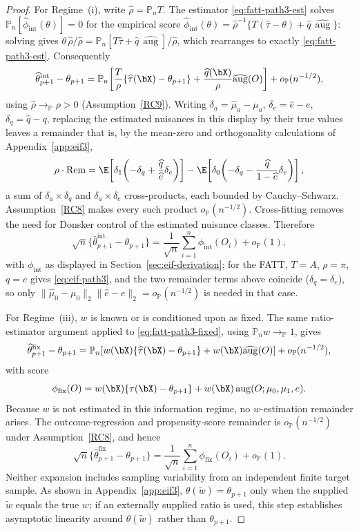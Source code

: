 \documentclass{article}
\renewcommand{\P}{\mathbb{P}}
\begin{document}
\begin{proof}
For Regime~(i), write $\widehat\rho=\mathbb{P}_n T$. The estimator \eqref{eq:fatt-path3-est} solves $\mathbb{P}_n[\widehat\phi_{\mathrm{int}}(\theta)]=0$ for the empirical score $\widehat\phi_{\mathrm{int}}(\theta) = \widehat\rho^{-1}\{T(\widehat\tau-\theta)+\widehat q\,\widehat{\operatorname{aug}}\}$: solving gives $\theta\,\widehat\rho/\widehat\rho = \mathbb{P}_n[T\widehat\tau+\widehat q\,\widehat{\operatorname{aug}}]/\widehat\rho$, which rearranges to exactly \eqref{eq:fatt-path3-est}. Consequently
\[
\widehat{\theta}_{p+1}^{\mathrm{int}}-\theta_{p+1}
=
\mathbb{P}_n\!\left[\frac{T}{\rho}\{\widehat\tau(\bX)-\theta_{p+1}\}+\frac{\widehat q(\bX)}{\rho}\widehat{\operatorname{aug}}(O)\right]
+
o_{\P}(n^{-1/2}),
\]
using $\widehat\rho\to_\P\rho>0$ (Assumption~\ref{RC9}). Writing $\delta_a=\widehat\mu_a-\mu_a$, $\delta_e=\widehat e-e$, $\delta_q=\widehat q-q$, replacing the estimated nuisances in this display by their true values leaves a remainder that is, by the mean-zero and orthogonality calculations of Appendix~\ref{app:eif3},
\[
\rho\cdot\mathrm{Rem}
=
\E\!\left[\delta_1\!\left(-\delta_q+\frac{\widehat q}{\widehat e}\delta_e\right)\right]
-
\E\!\left[\delta_0\!\left(-\delta_q-\frac{\widehat q}{1-\widehat e}\delta_e\right)\right],
\]
a sum of $\delta_a\times\delta_q$ and $\delta_a\times\delta_e$ cross-products, each bounded by Cauchy--Schwarz. Assumption~\ref{RC8} makes every such product $o_{\P}(n^{-1/2})$. Cross-fitting removes the need for Donsker control of the estimated nuisance classes. Therefore
\[
\sqrt n
\{\widehat{\theta}_{p+1}^{\mathrm{int}}-\theta_{p+1}\}
=
\frac{1}{\sqrt n}
\sum_{i=1}^n
\phi_{\mathrm{int}}(O_i)
+
o_{\P}(1),
\]
with $\phi_{\mathrm{int}}$ as displayed in Section~\ref{sec:eif-derivation}; for the FATT, $T=A$, $\rho=\pi$, $q=e$ gives \eqref{eq:eif-path3}, and the two remainder terms above coincide ($\delta_q=\delta_e$), so only $\|\widehat\mu_0-\mu_0\|_2\|\widehat e-e\|_2=o_{\P}(n^{-1/2})$ is needed in that case.

For Regime~(iii), $w$ is known or is conditioned upon as fixed. The same ratio-estimator argument applied to \eqref{eq:fatt-path3-fixed}, using $\mathbb{P}_n w\to_\P 1$, gives
\[
\widehat{\theta}_{p+1}^{\mathrm{fix}}-\theta_{p+1}
=
\mathbb{P}_n\!\left[w(\bX)\{\widehat\tau(\bX)-\theta_{p+1}\}+w(\bX)\widehat{\operatorname{aug}}(O)\right]
+
o_{\P}(n^{-1/2}),
\]
with score
\[
\phi_{\mathrm{fix}}(O)
=
w(\bX)\{\tau(\bX)-\theta_{p+1}\}
+
w(\bX)\operatorname{aug}(O;\mu_0,\mu_1,e).
\]
Because $w$ is not estimated in this information regime, no $w$-estimation remainder arises. The outcome-regression and propensity-score remainder is $o_{\P}(n^{-1/2})$ under Assumption~\ref{RC8}, and hence
\[
\sqrt n
\{\widehat{\theta}_{p+1}^{\mathrm{fix}}-\theta_{p+1}\}
=
\frac{1}{\sqrt n}
\sum_{i=1}^n
\phi_{\mathrm{fix}}(O_i)
+
o_{\P}(1).
\]
Neither expansion includes sampling variability from an independent finite target sample. As shown in Appendix~\ref{app:eif3}, $\theta(\widetilde w)=\theta_{p+1}$ only when the supplied $\widetilde w$ equals the true $w$; if an externally supplied ratio is used, this step establishes asymptotic linearity around $\theta(\widetilde w)$ rather than $\theta_{p+1}$.


\end{proof}
\end{document}
